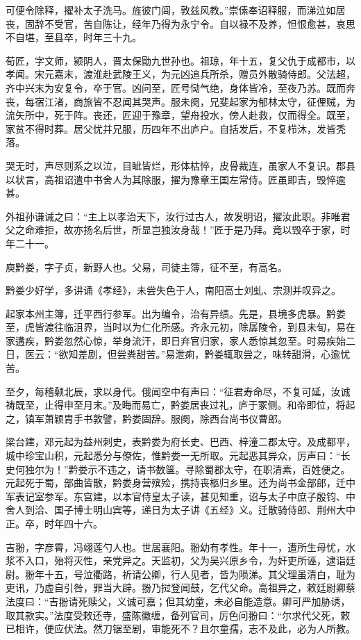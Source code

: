 \documentclass[12pt,UTF8]{ctexbook}
\begin{document}
可便令除释，擢补太子洗马。旌彼门闾，敦兹风教。”崇傃奉诏释服，而涕泣如居丧，固辞不受官，苦自陈让，经年乃得为永宁令。自以禄不及养，怛恨愈甚，哀思不自堪，至县卒，时年三十九。

荀匠，字文师，颍阴人，晋太保勖九世孙也。祖琼，年十五，复父仇于成都市，以孝闻。宋元嘉末，渡淮赴武陵王义，为元凶追兵所杀，赠员外散骑侍郎。父法超，齐中兴末为安复令，卒于官。凶问至，匠号恸气绝，身体皆冷，至夜乃苏。既而奔丧，每宿江渚，商旅皆不忍闻其哭声。服未阕，兄斐起家为郁林太守，征俚贼，为流矢所中，死于阵。丧还，匠迎于豫章，望舟投水，傍人赴救，仅而得全。既至，家贫不得时葬。居父忧并兄服，历四年不出庐户。自括发后，不复栉沐，发皆秃落。

哭无时，声尽则系之以泣，目眦皆烂，形体枯悴，皮骨裁连，虽家人不复识。郡县以状言，高祖诏遣中书舍人为其除服，擢为豫章王国左常侍。匠虽即吉，毁悴逾甚。

外祖孙谦诫之曰：“主上以孝治天下，汝行过古人，故发明诏，擢汝此职。非唯君父之命难拒，故亦扬名后世，所显岂独汝身哉！”匠于是乃拜。竟以毁卒于家，时年二十一。

庾黔娄，字子贞，新野人也。父易，司徒主簿，征不至，有高名。

黔娄少好学，多讲诵《孝经》，未尝失色于人，南阳高士刘虬、宗测并叹异之。

起家本州主簿，迁平西行参军。出为编令，治有异绩。先是，县境多虎暴。黔娄至，虎皆渡往临沮界，当时以为仁化所感。齐永元初，除孱陵令，到县未旬，易在家遘疾，黔娄忽然心惊，举身流汗，即日弃官归家，家人悉惊其忽至。时易疾始二日，医云：“欲知差剧，但尝粪甜苦。”易泄痢，黔娄辄取尝之，味转甜滑，心逾忧苦。

至夕，每稽颡北辰，求以身代。俄闻空中有声曰：“征君寿命尽，不复可延，汝诚祷既至，止得申至月末。”及晦而易亡，黔娄居丧过礼，庐于冢侧。和帝即位，将起之，镇军萧颖胄手书敦譬，黔娄固辞。服阕，除西台尚书仪曹郎。

梁台建，邓元起为益州刺史，表黔娄为府长史、巴西、梓潼二郡太守。及成都平，城中珍宝山积，元起悉分与僚佐，惟黔娄一无所取。元起恶其异众，厉声曰：“长史何独尔为！”黔娄示不违之，请书数箧。寻除蜀郡太守，在职清素，百姓便之。元起死于蜀，部曲皆散，黔娄身营殡殓，携持丧柩归乡里。还为尚书金部郎，迁中军表记室参军。东宫建，以本官侍皇太子读，甚见知重，诏与太子中庶子殷钧、中舍人到洽、国子博士明山宾等，递日为太子讲《五经》义。迁散骑侍郎、荆州大中正。卒，时年四十六。

吉翂，字彦霄，冯翊莲勺人也。世居襄阳。翂幼有孝性。年十一，遭所生母忧，水浆不入口，殆将灭性，亲党异之。天监初，父为吴兴原乡令，为奸吏所诬，逮诣廷尉。翂年十五，号泣衢路，祈请公卿，行人见者，皆为陨涕。其父理虽清白，耻为吏讯，乃虚自引咎，罪当大辟。翂乃挝登闻鼓，乞代父命。高祖异之，敕廷尉卿蔡法度曰：“吉翂请死赎父，义诚可嘉；但其幼童，未必自能造意。卿可严加胁诱，取其款实。”法度受敕还寺，盛陈徽缠，备列官司，厉色问翂曰：“尔求代父死，敕已相许，便应伏法。然刀锯至剧，审能死不？且尔童孺，志不及此，必为人所教。
\end{document}
